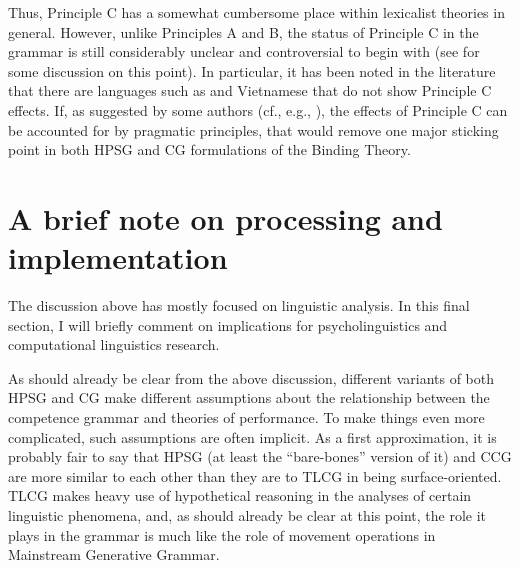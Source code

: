 \documentclass[output=paper
                ,modfonts
 	        ,biblatex
                ,babelshorthands
                ,newtxmath
                ,draftmode
                ,colorlinks, citecolor=brown
]{langscibook}
\begin{document}

Thus, Principle C has a somewhat cumbersome place within lexicalist
theories in general. However, unlike Principles A and B, the status of
Principle C in the grammar is still considerably unclear and
controversial to begin with (see \citealt[122--124]{buringbinding} for
some discussion on this point). In particular, it has been noted in
the literature \citep{lasnik86} that there are languages such as 
and Vietnamese that do not show Principle C effects. If, as suggested
by some authors (cf., e.g., \citealt{levinson87,levinson91}), the
effects of Principle C can be accounted for by pragmatic principles,
that would remove one major sticking point in both HPSG and CG
formulations of the Binding Theory.


\section{A brief note on processing and implementation \label{implementation}}

The discussion above has mostly focused on linguistic analysis. In
this final section, I will briefly comment on implications for
psycholinguistics and computational linguistics research.

As should already be clear from the above discussion, different
variants of both HPSG and CG make different assumptions
about the relationship between the competence grammar and theories of
performance. To make things even more complicated, such assumptions
are often implicit. As a first approximation, it is probably fair to
say that HPSG (at least the ``bare-bones'' version of it) and CCG are
more similar to each other than they are to TLCG in being
surface-oriented. TLCG makes heavy use of hypothetical reasoning in
the analyses of certain linguistic phenomena, and, as should already
be clear at this point, the role it plays in the grammar is much like
the role of movement operations in Mainstream Generative Grammar.
\end{document}
